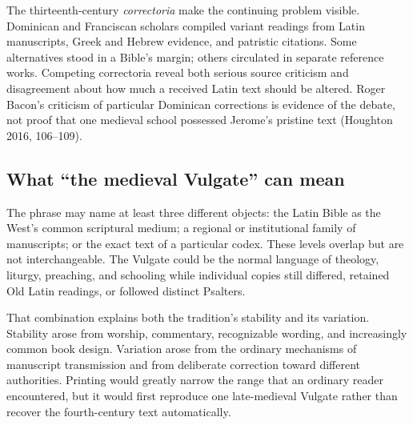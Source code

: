 The thirteenth-century \emph{correctoria} make the continuing problem visible. Dominican and Franciscan scholars compiled variant readings from Latin manuscripts, Greek and Hebrew evidence, and patristic citations. Some alternatives stood in a Bible's margin; others circulated in separate reference works. Competing correctoria reveal both serious source criticism and disagreement about how much a received Latin text should be altered. Roger Bacon's criticism of particular Dominican corrections is evidence of the debate, not proof that one medieval school possessed Jerome's pristine text (Houghton 2016, 106--109).

\subsection{What ``the medieval Vulgate'' can mean}

The phrase may name at least three different objects: the Latin Bible as the West's common scriptural medium; a regional or institutional family of manuscripts; or the exact text of a particular codex. These levels overlap but are not interchangeable. The Vulgate could be the normal language of theology, liturgy, preaching, and schooling while individual copies still differed, retained Old Latin readings, or followed distinct Psalters.

That combination explains both the tradition's stability and its variation. Stability arose from worship, commentary, recognizable wording, and increasingly common book design. Variation arose from the ordinary mechanisms of manuscript transmission and from deliberate correction toward different authorities. Printing would greatly narrow the range that an ordinary reader encountered, but it would first reproduce one late-medieval Vulgate rather than recover the fourth-century text automatically.
